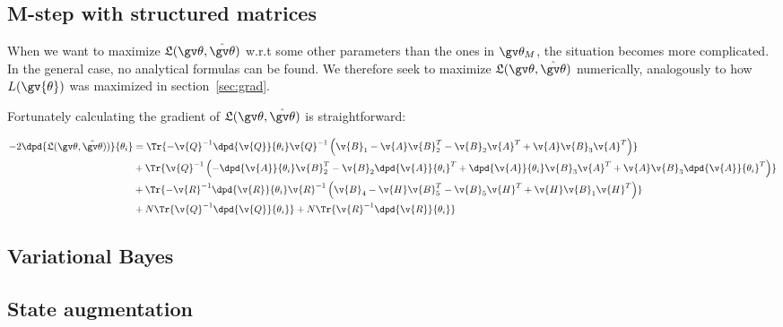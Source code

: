 \subsection{M-step with structured matrices}

When we want to maximize $\Lb(\Th,\hat{\Th})$ w.r.t some other
parameters than the ones in $\Th_M$, the situation becomes more complicated.
In the general case, no analytical formulas can be found. We therefore seek
to maximize $\Lb(\Th,\hat{\Th})$ numerically, analogously to how $L(\gv{\theta})$
was maximized in section~\ref{sec:grad}.

Fortunately calculating the gradient of $\Lb(\Th,\hat{\Th})$ is straightforward:

\begin{align}
\begin{split}
	-2\dpd{\Lb(\Th,\hat{\Th}))}{\theta_i}
	&=\Tr{-\v{Q}^{-1}\dpd{\v{Q}}{\theta_i}\v{Q}^{-1}
	\left(\v{B}_1-\v{A}\v{B}_2^T-\v{B}_2\v{A}^T+\v{A}\v{B}_3\v{A}^T\right)}\\
	&+\Tr{\v{Q}^{-1}\left(-\dpd{\v{A}}{\theta_i}\v{B}_2^T-\v{B}_2\dpd{\v{A}}{\theta_i}^T+\dpd{\v{A}}{\theta_i}\v{B}_3\v{A}^T+\v{A}\v{B}_3\dpd{\v{A}}{\theta_i}^T\right)}\\
	&+\Tr{-\v{R}^{-1}\dpd{\v{R}}{\theta_i}\v{R}^{-1}
	\left(\v{B}_4-\v{H}\v{B}_5^T-\v{B}_5\v{H}^T+\v{H}\v{B}_1\v{H}^T\right)}\\
	&+N\Tr{\v{Q}^{-1}\dpd{\v{Q}}{\theta_i}}
	+N\Tr{\v{R}^{-1}\dpd{\v{R}}{\theta_i}}\\
	\label{eq:dLB}
\end{split}
\end{align}
\subsection{Variational Bayes}
\subsection{State augmentation}